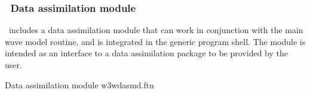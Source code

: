 \vsssub
\subsubsection{~Data assimilation module} \label{sec:data_ass}
\vsssub

\ww\ includes a data assimilation module that can work in conjunction with the
main wave model routine, and is integrated in the generic program shell. The
module is intended as an interface to a data assimilation package to be
provided by the user.

\vspace{\baselineskip} \noindent
Data assimilation module \hfill {\file w3wdasmd.ftn}

\begin{flisti}
\end{flisti}